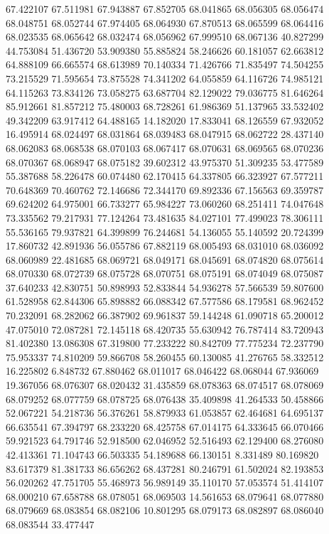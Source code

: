 67.422107
67.511981
67.943887
67.852705
68.041865
68.056305
68.056474
68.048751
68.052744
67.974405
68.064930
67.870513
68.065599
68.064416
68.023535
68.065642
68.032474
68.056962
67.999510
68.067136
40.827299
44.753084
51.436720
53.909380
55.885824
58.246626
60.181057
62.663812
64.888109
66.665574
68.613989
70.140334
71.426766
71.835497
74.504255
73.215529
71.595654
73.875528
74.341202
64.055859
64.116726
74.985121
64.115263
73.834126
73.058275
63.687704
82.129022
79.036775
81.646264
85.912661
81.857212
75.480003
68.728261
61.986369
51.137965
33.532402
49.342209
63.917412
64.488165
14.182020
17.833041
68.126559
67.932052
16.495914
68.024497
68.031864
68.039483
68.047915
68.062722
28.437140
68.062083
68.068538
68.070103
68.067417
68.070631
68.069565
68.070236
68.070367
68.068947
68.075182
39.602312
43.975370
51.309235
53.477589
55.387688
58.226478
60.074480
62.170415
64.337805
66.323927
67.577211
70.648369
70.460762
72.146686
72.344170
69.892336
67.156563
69.359787
69.624202
64.975001
66.733277
65.984227
73.060260
68.251411
74.047648
73.335562
79.217931
77.124264
73.481635
84.027101
77.499023
78.306111
55.536165
79.937821
64.399899
76.244681
54.136055
55.140592
20.724399
17.860732
42.891936
56.055786
67.882119
68.005493
68.031010
68.036092
68.060989
22.481685
68.069721
68.049171
68.045691
68.074820
68.075614
68.070330
68.072739
68.075728
68.070751
68.075191
68.074049
68.075087
37.640233
42.830751
50.898993
52.833844
54.936278
57.566539
59.807600
61.528958
62.844306
65.898882
66.088342
67.577586
68.179581
68.962452
70.232091
68.282062
66.387902
69.961837
59.144248
61.090718
65.200012
47.075010
72.087281
72.145118
68.420735
55.630942
76.787414
83.720943
81.402380
13.086308
67.319800
77.233222
80.842709
77.775234
72.237790
75.953337
74.810209
59.866708
58.260455
60.130085
41.276765
58.332512
16.225802
6.848732
67.880462
68.011017
68.046422
68.068044
67.936069
19.367056
68.076307
68.020432
31.435859
68.078363
68.074517
68.078069
68.079252
68.077759
68.078725
68.076438
35.409898
41.264533
50.458866
52.067221
54.218736
56.376261
58.879933
61.053857
62.464681
64.695137
66.635541
67.394797
68.233220
68.425758
67.014175
64.333645
66.070466
59.921523
64.791746
52.918500
62.046952
52.516493
62.129400
68.276080
42.413361
71.104743
66.503335
54.189688
66.130151
8.331489
80.169820
83.617379
81.381733
86.656262
68.437281
80.246791
61.502024
82.193853
56.020262
47.751705
55.468973
56.989149
35.110170
57.053574
51.414107
68.000210
67.658788
68.078051
68.069503
14.561653
68.079641
68.077880
68.079669
68.083854
68.082106
10.801295
68.079173
68.082897
68.086040
68.083544
33.477447
